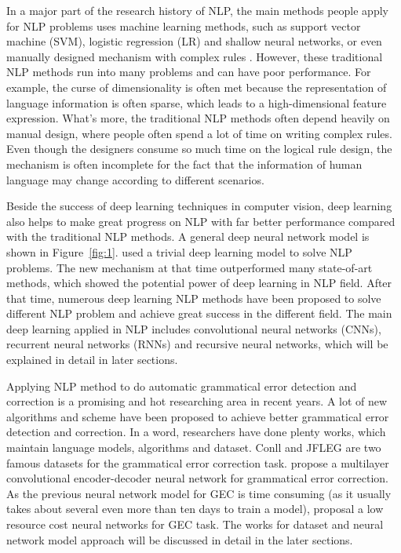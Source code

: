 In a major part of the research history of NLP, the main methods people apply for NLP problems uses machine learning methods, such as support vector machine (SVM), logistic regression (LR) and shallow neural networks, or even manually designed mechanism with complex rules \cite{young2018recent}. However, these traditional NLP methods run into many problems and can have poor performance. For example, the curse of dimensionality is often met because the representation of language information is often sparse, which leads to a high-dimensional feature expression. What’s more, the traditional NLP methods often depend heavily on manual design, where people often spend a lot of time on writing complex rules. Even though the designers consume so much time on the logical rule design, the mechanism is often incomplete for the fact that the information of human language may change according to different scenarios.

Beside the success of deep learning techniques in computer vision, deep learning also helps to make great progress on NLP with far better performance compared with the traditional NLP methods. A general deep neural network model is shown in Figure~\ref{fig:1}. \cite{collobert2011natural} used a trivial deep learning model to solve NLP problems. The new mechanism at that time outperformed many state-of-art methods, which showed the potential power of deep learning in NLP field. After that time, numerous deep learning NLP methods have been proposed to solve different NLP problem and achieve great success in the different field. The main deep learning applied in NLP includes convolutional neural networks (CNNs), recurrent neural networks (RNNs) and recursive neural networks, which will be explained in detail in later sections.

Applying NLP method to do automatic grammatical error detection and correction is a promising and hot researching area in recent years. A lot of new algorithms and scheme have been proposed to achieve better grammatical error detection and correction. In a word, researchers have done plenty works, which maintain language models, algorithms and dataset. Conll and JFLEG \cite{ng2014conll,napoles2017jfleg} are two famous datasets for the grammatical error correction task. \cite{chollampatt2018multilayer} propose a multilayer convolutional encoder-decoder neural network for grammatical error correction. As the previous neural network model for GEC is time consuming (as it usually takes about several even more than ten days to train a model), \cite{junczys2018approaching} proposal a low resource cost neural networks for GEC task. The works for dataset and neural network model approach will be discussed in detail in the later sections.


